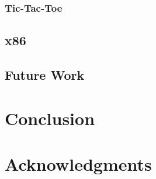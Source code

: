 \documentclass{sig-alternate}
\begin{document}
\subsubsection{Tic-Tac-Toe}


\subsection{x86}

\subsection{Future Work}

\section{Conclusion}


\section{Acknowledgments}


%

%
%
\end{document}

